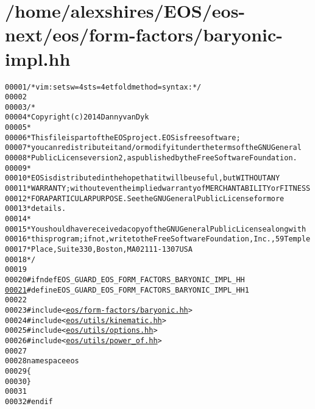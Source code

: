 \hypertarget{baryonic-impl_8hh_source}{
\section{/home/alexshires/EOS/eos-\/next/eos/form-\/factors/baryonic-\/impl.hh}
}


\begin{footnotesize}\begin{alltt}
00001 \textcolor{comment}{/* vim: set sw=4 sts=4 et foldmethod=syntax : */}
00002 
00003 \textcolor{comment}{/*}
00004 \textcolor{comment}{ * Copyright (c) 2014 Danny van Dyk}
00005 \textcolor{comment}{ *}
00006 \textcolor{comment}{ * This file is part of the EOS project. EOS is free software;}
00007 \textcolor{comment}{ * you can redistribute it and/or modify it under the terms of the GNU General}
00008 \textcolor{comment}{ * Public License version 2, as published by the Free Software Foundation.}
00009 \textcolor{comment}{ *}
00010 \textcolor{comment}{ * EOS is distributed in the hope that it will be useful, but WITHOUT ANY}
00011 \textcolor{comment}{ * WARRANTY; without even the implied warranty of MERCHANTABILITY or FITNESS}
00012 \textcolor{comment}{ * FOR A PARTICULAR PURPOSE.  See the GNU General Public License for more}
00013 \textcolor{comment}{ * details.}
00014 \textcolor{comment}{ *}
00015 \textcolor{comment}{ * You should have received a copy of the GNU General Public License along with}
00016 \textcolor{comment}{ * this program; if not, write to the Free Software Foundation, Inc., 59 Temple}
00017 \textcolor{comment}{ * Place, Suite 330, Boston, MA  02111-1307  USA}
00018 \textcolor{comment}{ */}
00019 
00020 \textcolor{preprocessor}{#ifndef EOS\_GUARD\_EOS\_FORM\_FACTORS\_BARYONIC\_IMPL\_HH}
\hypertarget{baryonic-impl_8hh_source_l00021}{}\hyperlink{baryonic-impl_8hh_acaeb03191ea820ed98356d32c67df0c8}{00021} \textcolor{preprocessor}{}\textcolor{preprocessor}{#define EOS\_GUARD\_EOS\_FORM\_FACTORS\_BARYONIC\_IMPL\_HH 1}
00022 \textcolor{preprocessor}{}
00023 \textcolor{preprocessor}{#include <\hyperlink{baryonic_8hh}{eos/form-factors/baryonic.hh}>}
00024 \textcolor{preprocessor}{#include <\hyperlink{kinematic_8hh}{eos/utils/kinematic.hh}>}
00025 \textcolor{preprocessor}{#include <\hyperlink{options_8hh}{eos/utils/options.hh}>}
00026 \textcolor{preprocessor}{#include <\hyperlink{power__of_8hh}{eos/utils/power_of.hh}>}
00027 
00028 \textcolor{keyword}{namespace }eos
00029 \{
00030 \}
00031 
00032 \textcolor{preprocessor}{#endif}
\end{alltt}\end{footnotesize}
